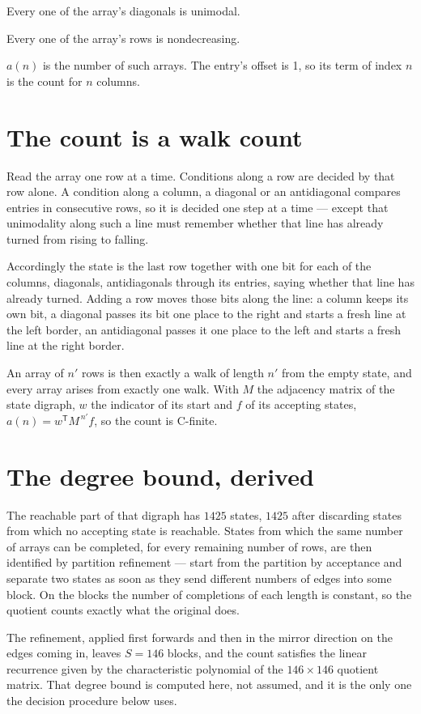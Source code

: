 \documentclass[11pt]{article}
\theoremstyle{definition}
\begin{document}
Every one of the array's diagonals is unimodal.

Every one of the array's rows is nondecreasing.

$a(n)$ is the number of such arrays. The entry's offset is 1, so its term of index $n$ is the count for $n$ columns.

\section{The count is a walk count}

Read the array one row at a time. Conditions along a row are decided by that row alone. A condition along a column, a diagonal or an antidiagonal compares entries in consecutive rows, so it is decided one step at a time --- except that unimodality along such a line must remember whether that line has already turned from rising to falling.

Accordingly the state is the last row together with one bit for each of the columns, diagonals, antidiagonals through its entries, saying whether that line has already turned. Adding a row moves those bits along the line: a column keeps its own bit, a diagonal passes its bit one place to the right and starts a fresh line at the left border, an antidiagonal passes it one place to the left and starts a fresh line at the right border.

An array of $n'$ rows is then exactly a walk of length $n'$ from the empty state, and every array arises from exactly one walk. With $M$ the adjacency matrix of the state digraph, $w$ the indicator of its start and $f$ of its accepting states, $a(n) = w^{\mathsf T}M^{\,n'}f$, so the count is C-finite.

\section{The degree bound, derived}

The reachable part of that digraph has $1425$ states, $1425$ after discarding states from which no accepting state is reachable. States from which the same number of arrays can be completed, for every remaining number of rows, are then identified by partition refinement --- start from the partition by acceptance and separate two states as soon as they send different numbers of edges into some block. On the blocks the number of completions of each length is constant, so the quotient counts exactly what the original does.

The refinement, applied first forwards and then in the mirror direction on the edges coming in, leaves $S = 146$ blocks, and the count satisfies the linear recurrence given by the characteristic polynomial of the $146 \times 146$ quotient matrix. That degree bound is computed here, not assumed, and it is the only one the decision procedure below uses.
\end{document}
